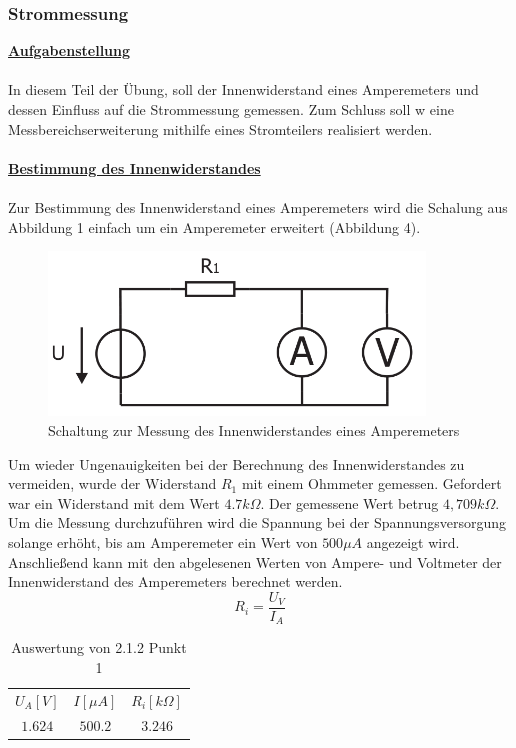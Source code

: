 \documentclass[a4paper,12pt]{article}
\begin{document}
	\subsubsection{Strommessung}
	\underline{\textbf{Aufgabenstellung}}\\ \\
	In diesem Teil der Übung, soll der Innenwiderstand eines Amperemeters und dessen Einfluss auf die Strommessung gemessen. Zum Schluss soll w eine Messbereichserweiterung mithilfe eines Stromteilers realisiert werden. \\ \\
	\noindent
	\underline{\textbf{Bestimmung des Innenwiderstandes}} \\ \\
	Zur Bestimmung des Innenwiderstand eines Amperemeters wird die Schalung aus Abbildung 1 einfach um ein Amperemeter erweitert (Abbildung 4).
	\begin{figure}[h]
		\centering
		\includegraphics[width=10cm]{img/Amperemeter_Innenwiderstand}
		\caption{Schaltung zur Messung des Innenwiderstandes eines Amperemeters}
	\end{figure}
	\newline
	Um wieder Ungenauigkeiten bei der Berechnung des Innenwiderstandes zu vermeiden, wurde der Widerstand $R_1$ mit einem Ohmmeter gemessen. Gefordert war ein Widerstand mit dem Wert $4.7k\Omega$. Der gemessene Wert betrug $4,709k\Omega$. Um die Messung durchzuführen wird die Spannung bei der Spannungsversorgung solange erhöht, bis am Amperemeter ein Wert von $500 \mu A$ angezeigt wird. Anschließend kann mit den abgelesenen Werten von Ampere- und Voltmeter der Innenwiderstand des Amperemeters berechnet werden. \\
	\[
		R_i = \frac{U_V}{I_A}
	\]
	\newpage
	\begin{table}[h]
		\centering
		\begin{tabular}{|c|c|c|}
			\hline
			\multirow{2}{*}{$U_A[V]$} & \multirow{2}{*}{$I[\mu A]$} & \multirow{2}{*}{$R_i[k\Omega]$} \\
			&  &  \\ \hline
			\multirow{2}{*}{$1.624$} & \multirow{2}{*}{$500.2$} & \multirow{2}{*}{$3.246$} \\
			&  &  \\ \hline
		\end{tabular}
	\caption{Auswertung von 2.1.2 Punkt 1}
	\end{table}
\end{document}
